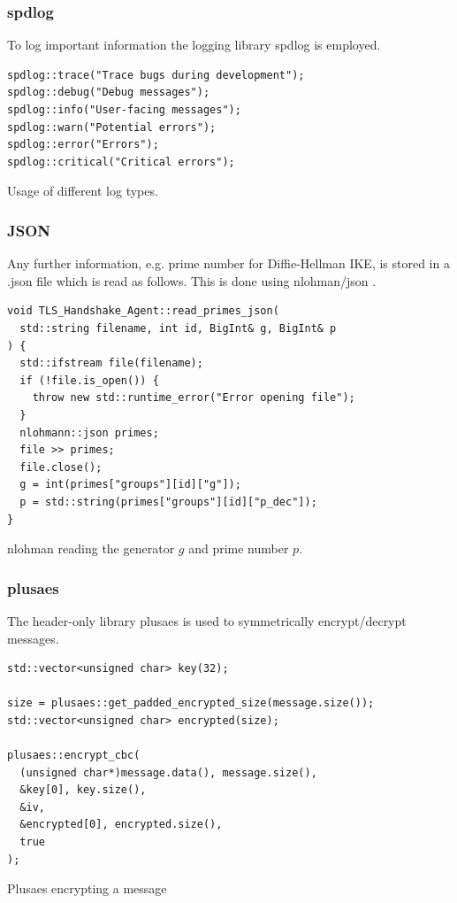 \documentclass[12pt, letterpaper]{article}
\newenvironment{code}{\captionsetup{type=listing}}{}
\begin{document}
\subsubsection{spdlog}
To log important information the logging library spdlog \cite{spdlog_ref} is employed.

\begin{code}
	\begin{verbatim}
spdlog::trace("Trace bugs during development");
spdlog::debug("Debug messages");
spdlog::info("User-facing messages");
spdlog::warn("Potential errors");
spdlog::error("Errors");
spdlog::critical("Critical errors");
	\end{verbatim}
	\caption{Usage of different log types.}
	\label{spdlog}
\end{code}


\subsubsection{JSON}
Any further information, e.g. prime number for Diffie-Hellman IKE, is stored in a .json file which is read as follows. This is done using nlohman/json \cite{json_ref}.

\begin{code}
	\begin{verbatim}
void TLS_Handshake_Agent::read_primes_json(
  std::string filename, int id, BigInt& g, BigInt& p
) {
  std::ifstream file(filename);
  if (!file.is_open()) {
    throw new std::runtime_error("Error opening file");
  }
  nlohmann::json primes;
  file >> primes;
  file.close();
  g = int(primes["groups"][id]["g"]); 
  p = std::string(primes["groups"][id]["p_dec"]);
}
	\end{verbatim}
	\caption{nlohman reading the generator $g$ and prime number $p$.}
	\label{json}
\end{code}


\subsubsection{plusaes}
The header-only library plusaes \cite{plusaes} is used to symmetrically encrypt/decrypt messages.

\begin{code}
	\begin{verbatim}
std::vector<unsigned char> key(32);
	
size = plusaes::get_padded_encrypted_size(message.size());
std::vector<unsigned char> encrypted(size);
	
plusaes::encrypt_cbc(
  (unsigned char*)message.data(), message.size(), 
  &key[0], key.size(), 
  &iv, 
  &encrypted[0], encrypted.size(), 
  true
);

	\end{verbatim}
	\caption{Plusaes encrypting a message}
	\label{plusaes}
\end{code}
\end{document}
